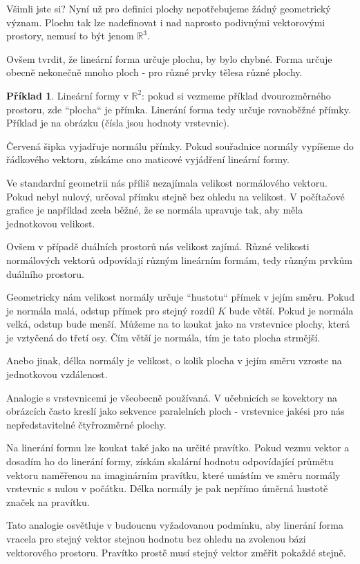 \documentclass[a5paper,12pt]{amsbook}
\theoremstyle{definition}
\newtheorem{example}{Příklad}[chapter]
\begin{document}
Všimli jste si? Nyní už pro definici plochy nepotřebujeme žádný geometrický význam. Plochu tak
lze nadefinovat i nad naprosto podivnými vektorovými prostory, nemusí to být jenom $\mathbb{R}^3$.

Ovšem tvrdit, že lineární forma určuje plochu, by bylo chybné. Forma určuje obecně nekonečně mnoho
ploch - pro různé prvky tělesa různé plochy.

\begin{example}\label{example:linforma1}Lineární formy v $\mathbb{R}^2$: pokud si vezmeme příklad
dvourozměrného prostoru, zde ``plocha`` je přímka. Linerání forma tedy určuje rovnoběžné přímky.
Příklad je na obrázku (čísla jsou hodnoty vrstevnic).
\begin{center}

\end{center}
Červená šipka vyjadřuje normálu přímky. Pokud souřadnice normály vypíšeme do řádkového
vektoru, získáme ono maticové vyjádření lineární formy.

Ve standardní geometrii nás příliš nezajímala velikost normálového vektoru. Pokud nebyl nulový, určoval
přímku stejně bez ohledu na velikost. V počítačové grafice je například zcela běžné, že se normála
upravuje tak, aby měla jednotkovou velikost.

Ovšem v případě duálních prostorů nás velikost zajímá. Různé velikosti normálových vektorů odpovídají
různým lineárním formám, tedy různým prvkům duálního prostoru.

Geometricky nám velikost normály určuje ``hustotu`` přímek v jejím směru. Pokud je normála malá,
odstup přímek pro stejný rozdíl $K$ bude větší. Pokud je normála velká, odstup bude menší. Můžeme
na to koukat jako na vrstevnice plochy, která je vztyčená do třetí osy. Čím větší je normála, tím
je tato plocha strmější.

Anebo jinak, délka normály je velikost, o kolik plocha v jejím směru vzroste na jednotkovou
vzdálenost.

Analogie s vrstevnicemi je všeobecně používaná. V učebnicích se kovektory na obrázcích často kreslí
jako sekvence paralelních ploch - vrstevnice jakési pro nás nepředstavitelné čtyřrozměrné plochy.

\medskip\noindent
Na linerání formu lze koukat také jako na určité pravítko. Pokud vezmu vektor a dosadím ho do linerání
formy, získám skalární hodnotu odpovídající průmětu vektoru naměřenou na imaginárním pravítku, které
umístím ve směru normály vrstevnic s nulou v počátku. Délka normály je pak nepřímo úměrná hustotě značek
na pravítku.

Tato analogie osvětluje v budoucnu vyžadovanou podmínku, aby linerání forma vracela pro stejný vektor
stejnou hodnotu bez ohledu na zvolenou bázi vektorového prostoru. Pravítko prostě musí stejný vektor
změřit pokaždé stejně.

\end{example}
\end{document}
